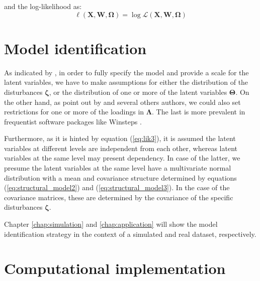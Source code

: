 \noindent and the log-likelihood as:
%
\begin{equation} \label{eq:loglik}
	\ell(\mathbf{X}, \mathbf{W}, \pmb{\Omega}) = \log \mathcal{L}(\mathbf{X}, \mathbf{W}, \pmb{\Omega})
\end{equation}


\section{Model identification} \label{sect:identification}

As indicated by \citet{Rabe_et_al_2004a}, in order to fully specify the model and provide a scale for the latent variables, we have to make assumptions for either the distribution of the disturbances $\pmb{\zeta}$, or the distribution of one or more of the latent variables $\pmb{\Theta}$. On the other hand, as point out by \citet{Fujimoto_2018b} and several others authors, we could also set restrictions for one or more of the loadings in $\pmb{\Lambda}$. The last is more prevalent in frequentist software packages like Winsteps \cite{Winsteps2021}.

Furthermore, as it is hinted by equation (\ref{eq:lik3}), it is assumed the latent variables at different levels are independent from each other, whereas latent variables at the same level may present dependency. In case of the latter, we presume the latent variables at the same level have a multivariate normal distribution with a mean and covariance structure determined by equations (\ref{eq:structural_model2}) and (\ref{eq:structural_model3}). In the case of the covariance matrices, these are determined by the covariance of the specific disturbances $\pmb{\zeta}$. 

Chapter \ref{chap:simulation} and \ref{chap:application} will show the model identification strategy in the context of a simulated and real dataset, respectively.



\section{Computational implementation} \label{sect:comp_imp}

